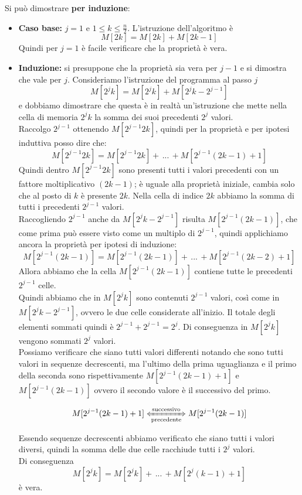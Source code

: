 \documentclass[11pt]{article}
\begin{document}
	Si può dimostrare \textbf{per induzione}: 
	\begin{itemize}
		\item \textbf{Caso base:} $j=1$ e $1 \leq k \leq \frac{n}{2}$. L'istruzione dell'algoritmo è
		$$ M[2k] = M[2k] + M[2k-1] $$
		Quindi per $j=1$ è facile verificare che la proprietà è vera.\\
		
		\item \textbf{Induzione:} si presuppone che la proprietà sia vera per $j-1$ e si dimostra che vale per $j$. Consideriamo l'istruzione del programma al passo $j$
		$$ M[2^j k] = M[2^j k] + M[2^jk - 2^{j-1}]$$
		e dobbiamo dimostrare che questa è in realtà un'istruzione che mette nella cella di memoria $2^j k$ la somma dei suoi precedenti $2^j$ valori.\\
		
		Raccolgo $2^{j-1}$ ottenendo $M[2^{j-1} 2k]$, quindi per la proprietà e per ipotesi induttiva posso dire che:
		$$ M[2^{j-1} 2k] = M[2^{j-1} 2k] + \, ... \, + M[2^{j-1} (2k-1)+1]$$
		Quindi dentro $M[2^{j-1} 2k]$ sono presenti tutti i valori precedenti con un fattore moltiplicativo $(2k-1)$; è uguale alla proprietà iniziale, cambia solo che al posto di $k$ è presente $2k$. Nella cella di indice $2k$ abbiamo la somma di tutti i precedenti $2^{j-1}$ valori.\\
		
		Raccogliendo $2^{j-1}$ anche da $M[2^jk - 2^{j-1}]$ risulta $M[2^{j-1} (2k-1)]$, che come prima può essere visto come un multiplo di $2^{j-1}$, quindi applichiamo ancora la proprietà per ipotesi di induzione:
		$$ M[2^{j-1} (2k-1)] = M[2^{j-1} (2k-1)] + \, ... \, + M[2^{j-1} (2k-2)+1]$$
		Allora abbiamo che la cella $M[2^{j-1} (2k-1)]$ contiene tutte le precedenti $2^{j-1}$ celle.\\
		
		Quindi abbiamo che in $M[2^j k]$ sono contenuti $2^{j-1}$ valori, così come in $M[2^jk - 2^{j-1}]$, ovvero le due celle considerate all'inizio. Il totale degli elementi sommati quindi è $2^{j-1} + 2^{j-1} = 2^j$. Di conseguenza in $M[2^j k]$ vengono sommati $2^j$ valori.\\
		
		Possiamo verificare che siano tutti valori differenti notando che sono tutti valori in sequenze decrescenti, ma l'ultimo della prima uguaglianza e il primo della seconda sono rispettivamente $M[2^{j-1} (2k-1)+1]$ e $M[2^{j-1} (2k-1)]$ ovvero il secondo valore è il successivo del primo.
		
		$$M[2^{j-1} (2k-1)+1] \xLeftrightarrow[\text{precedente}]{\text{successivo}} M[2^{j-1} (2k-1)]$$
		
		Essendo sequenze decrescenti abbiamo verificato che siano tutti i valori diversi, quindi la somma delle due celle racchiude tutti i $2^j$ valori.\\
		
		Di conseguenza
		$$ M[2^j k] = M[2^j k] + \, ... \, + M[2^j (k-1) + 1] $$
		è vera.\\
		
	\end{itemize}
	
\end{document}
